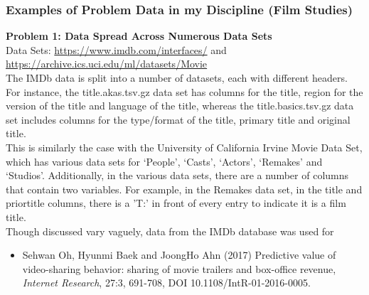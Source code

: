 \documentclass{article}
\begin{document}
\begin{FlushLeft}
\subsubsection*{Examples of Problem Data in my Discipline (Film Studies) }
\textbf{Problem 1: Data Spread Across Numerous Data Sets}\\
Data Sets: \url{https://www.imdb.com/interfaces/} and \url{https://archive.ics.uci.edu/ml/datasets/Movie}\\
The IMDb data is split into a number of datasets, each with different headers. For instance, the title.akas.tsv.gz data set has columns for the title, region for the version of the title and language of the title, whereas the title.basics.tsv.gz data set includes columns for the type/format of the title, primary title and original title.\\
This is similarly the case with the University of California Irvine Movie Data Set, which has various data sets for ‘People’, ‘Casts’, ‘Actors’, ‘Remakes’ and ‘Studios’. Additionally, in the various data sets, there are a number of columns that contain two variables. For example, in the Remakes data set, in the title and priortitle columns, there is a ’T:’ in front of every entry to indicate it is a film title.\\
Though discussed vary vaguely, data from the IMDb database was used for\\
\begin{itemize}
\item Sehwan Oh, Hyunmi Baek and JoongHo Ahn (2017) Predictive value of video-sharing behavior: sharing of movie trailers and box-office revenue, \textit{Internet Research}, 27:3, 691-708, DOI 10.1108/IntR-01-2016-0005.
\end{itemize}


\end{FlushLeft}
\end{document}
